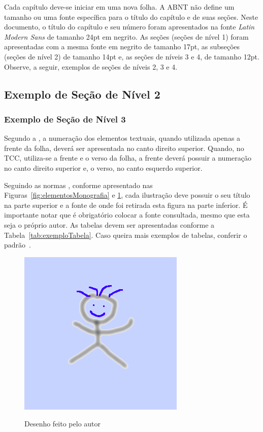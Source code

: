 Cada capítulo deve-se iniciar em uma nova folha. A ABNT não define um tamanho ou uma fonte específica para o título do capítulo e de suas seções. Neste documento, o título do capítulo e seu número foram apresentados na fonte \textit{Latin Modern Sans} de tamanho 24pt em negrito. 
As seções (seções de nível 1) foram apresentadas com a mesma fonte em negrito de tamanho 17pt, as subseções (seções de nível 2) de tamanho 14pt e, as seções de níveis 3 e 4, de tamanho 12pt. Observe, a seguir, exemplos de seções de níveis 2, 3 e 4.




\subsection{Exemplo de Seção de Nível 2}
\subsubsection{Exemplo de Seção de Nível 3}

Segundo a , a numeração dos elementos textuais, quando utilizada apenas a frente da folha, deverá ser apresentada no canto direito superior. Quando, no TCC, utiliza-se a frente e o verso da folha, a frente deverá possuir a numeração no canto direito superior e, o verso, no canto esquerdo superior.

Seguindo as normas  , conforme apresentado nas Figuras~\ref{fig:elementosMonografia} e \ref{fig:desenhoAutor}, cada ilustração deve possuir o seu título na parte superior e a fonte de onde foi retirada esta figura na parte inferior. É importante notar que é obrigatório colocar a fonte consultada, mesmo que esta seja o próprio autor. As tabelas devem ser apresentadas conforme a Tabela~\ref{tab:exemploTabela}. Caso queira mais exemplos de tabelas, conferir o padrão~. 

\begin{figure}[htb!]
    \centering
    \caption{Desenho feito pelo autor}
    \includegraphics[keepaspectratio=true,scale=0.62]
    	{img/desenho.png}
    \label{fig:desenhoAutor}
\end{figure}


